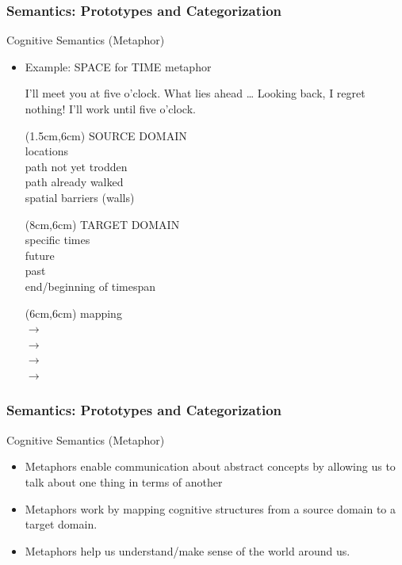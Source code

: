 \documentclass[12pt, table]{beamer}
\begin{document}
\begin{frame}
\frametitle{Semantics: Prototypes and Categorization}
Cognitive Semantics (Metaphor)
\begin{itemize}
\item Example: SPACE for TIME metaphor
\begin{exe}
\ex I'll meet you at five o'clock.
\ex What lies ahead \dots
\ex Looking back, I regret nothing!
\ex I'll work until five o'clock.\\[5cm]
\end{exe}
\begin{textblock*}{5cm}(1.5cm,6cm)
SOURCE DOMAIN\\[.25cm]
locations\\
path not yet trodden\\
path already walked\\
spatial barriers (walls)\\
\end{textblock*}
\begin{textblock*}{5cm}(8cm,6cm)
TARGET DOMAIN\\[.25cm]
specific times \\
future \\
past \\
end/beginning of timespan \\
\end{textblock*}
\begin{textblock*}{5cm}(6cm,6cm)
mapping \\[.25cm]
$\rightarrow$ \\
$\rightarrow$ \\
$\rightarrow$ \\
$\rightarrow$ \\
\end{textblock*}
\end{itemize}
\end{frame}

\begin{frame}
\frametitle{Semantics: Prototypes and Categorization}
Cognitive Semantics (Metaphor)
\begin{itemize}
\item Metaphors enable communication about abstract concepts by allowing us to talk about one thing in terms of another
\item Metaphors work by mapping cognitive structures from a source domain to a target domain.
\item Metaphors help us understand/make sense of the world around us. 
\end{itemize}
\end{frame}
\end{document}
